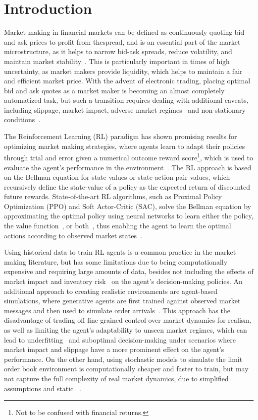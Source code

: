 \section{Introduction}
\label{sec:introduction}

Market making in financial markets can be defined as continuously quoting bid and ask prices to profit from thespread,
and is an essential part of the market microstructure, as it helps to narrow bid-ask spreads, reduce volatility, and maintain market stability~\cite{Glosten1985, OHara1995}.
This is particularly important in times of high uncertainty, as market makers provide liquidity, which helps to maintain a fair and efficient market price.
With the advent of electronic trading, placing optimal bid and ask quotes as a market maker is becoming an almost completely automatized task,
but such a transition requires dealing with additional caveats, including slippage, market impact, adverse market regimes~\cite{Cont2010, Bouchaud2018}
and non-stationary conditions~\cite{Gasperov2021}.

The Reinforcement Learning (RL) paradigm has shown promising results for optimizing market making strategies,
where agents learn to adapt their policies through trial and error given a numerical outcome reward score\footnote{Not to be confused with financial returns.},
which is used to evaluate the agent's performance in the environment~\cite{Sutton2018}.
The RL approach is based on the Bellman equation for state values or state-action pair values,
which recursively define the state-value of a policy as the expected return of discounted future rewards.
State-of-the-art RL algorithms, such as Proximal Policy Optimization (PPO) and Soft Actor-Critic (SAC),
solve the Bellman equation by approximating the optimal policy using neural networks to learn either the policy, the value function~\cite{Sutton2018},
or both~\cite{Schulman2015, Mnih2015}, thus enabling the agent to learn the optimal actions according to observed market states~\cite{He2023, Bakshaev2020}.

Using historical data to train RL agents is a common practice in the market making literature, but has some limitations
due to being computationally expensive and requiring large amounts of data,
besides not including the effects of market impact and inventory risk~\cite{Frey2023, Ganesh2019} on the agent's decision-making policies.
An additional approach to creating realistic environments are agent-based simulations,
where generative agents are first trained against observed market messages and then used to simulate order arrivals~\cite{Jerome2022, Selser2021}.
This approach has the disadvantage of trading off fine-grained control over market dynamics for realism,
as well as limiting the agent's adaptability to unseen market regimes, which can lead to underfitting~\cite{Jerome2022, Selser2021}
and suboptimal decision-making under scenarios where market impact and slippage have a more prominent effect on the agent's performance.
On the other hand, using stochastic models to simulate the limit order book environment is computationally cheaper and faster to train,
but may not capture the full complexity of real market dynamics, due to simplified assumptions and static ~\cite{Sun2022}.

